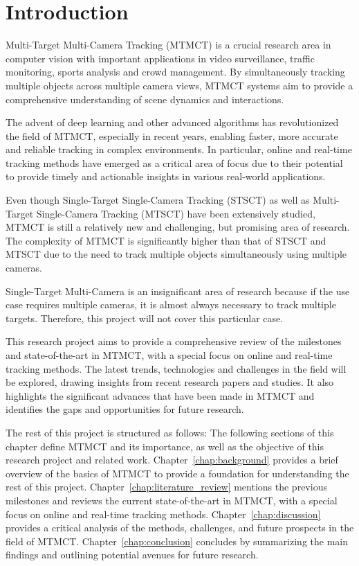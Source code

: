 \chapter{Introduction}\label{chap:introduction}
Multi-Target Multi-Camera Tracking (MTMCT) is a crucial research area in computer vision with important applications in video surveillance, traffic monitoring, sports analysis and crowd management. By simultaneously tracking multiple objects across multiple camera views, MTMCT systems aim to provide a comprehensive understanding of scene dynamics and interactions.

The advent of deep learning and other advanced algorithms has revolutionized the field of MTMCT, especially in recent years, enabling faster, more accurate and reliable tracking in complex environments. In particular, online and real-time tracking methods have emerged as a critical area of focus due to their potential to provide timely and actionable insights in various real-world applications.

Even though Single-Target Single-Camera Tracking (STSCT) as well as Multi-Target Single-Camera Tracking (MTSCT) have been extensively studied, MTMCT is still a relatively new and challenging, but promising area of research. The complexity of MTMCT is significantly higher than that of STSCT and MTSCT due to the need to track multiple objects simultaneously using multiple cameras.

Single-Target Multi-Camera is an insignificant area of research because if the use case requires multiple cameras, it is almost always necessary to track multiple targets. Therefore, this project will not cover this particular case.

This research project aims to provide a comprehensive review of the milestones and state-of-the-art in MTMCT, with a special focus on online and real-time tracking methods. The latest trends, technologies and challenges in the field will be explored, drawing insights from recent research papers and studies. It also highlights the significant advances that have been made in MTMCT and identifies the gaps and opportunities for future research.

The rest of this project is structured as follows: The following sections of this chapter define MTMCT and its importance, as well as the objective of this research project and related work. Chapter~\ref{chap:background} provides a brief overview of the basics of MTMCT to provide a foundation for understanding the rest of this project. Chapter~\ref{chap:literature_review} mentions the previous milestones and reviews the current state-of-the-art in MTMCT, with a special focus on online and real-time tracking methods. Chapter~\ref{chap:discussion} provides a critical analysis of the methods, challenges, and future prospects in the field of MTMCT. Chapter~\ref{chap:conclusion} concludes by summarizing the main findings and outlining potential avenues for future research.

